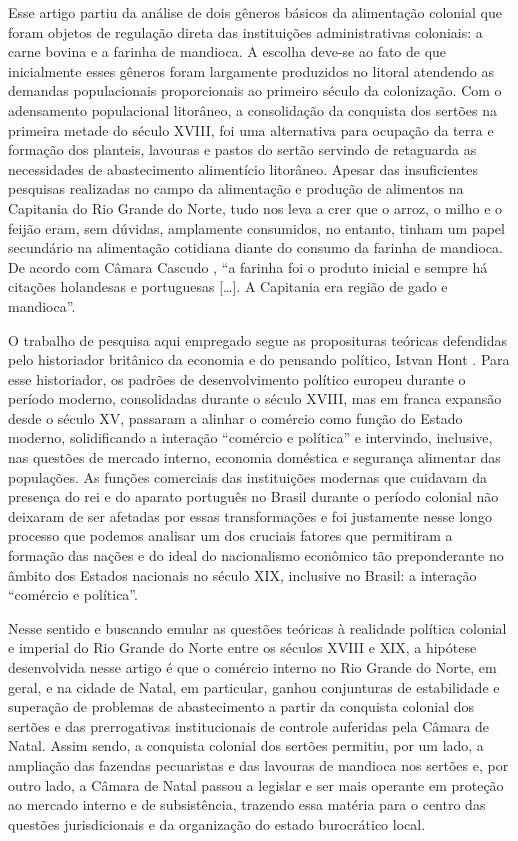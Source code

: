 \begin{refsection}
Esse artigo partiu da análise de dois gêneros básicos da alimentação colonial que foram objetos de regulação direta das instituições administrativas coloniais: a carne bovina e a farinha de mandioca. A escolha deve-se ao fato de que inicialmente esses gêneros foram largamente produzidos no litoral atendendo as demandas populacionais proporcionais ao primeiro século da colonização. Com o adensamento populacional litorâneo, a consolidação da conquista dos sertões na primeira metade do século XVIII, foi uma alternativa para ocupação da terra e formação dos planteis, lavouras e pastos do sertão servindo de retaguarda as necessidades de abastecimento alimentício litorâneo. Apesar das insuficientes pesquisas realizadas no campo da alimentação e produção de alimentos na Capitania do Rio Grande do Norte, tudo nos leva a crer que o arroz, o milho e o feijão eram, sem dúvidas, amplamente consumidos, no entanto, tinham um papel secundário na alimentação cotidiana diante do consumo da farinha de mandioca. De acordo com Câmara Cascudo \citeyear[p.~78]{Cascudo1980}, “a farinha foi o produto inicial e sempre há citações holandesas e portuguesas [\dots]. A Capitania era região de gado e mandioca”. 

O trabalho de pesquisa aqui empregado segue as proposituras teóricas defendidas pelo historiador britânico da economia e do pensando político, Istvan Hont \citeyear{hont2005jealousy}. Para esse historiador, os padrões de desenvolvimento político europeu durante o período moderno, consolidadas durante o século XVIII, mas em franca expansão desde o século XV, passaram a alinhar o comércio como função do Estado moderno, solidificando a interação ``comércio e política'' e intervindo, inclusive, nas questões de mercado interno, economia doméstica e segurança alimentar das populações. As funções comerciais das instituições modernas que cuidavam da presença do rei e do aparato português no Brasil durante o período colonial não deixaram de ser afetadas por essas transformações e foi justamente nesse longo processo que podemos analisar um dos cruciais fatores que permitiram a formação das nações e do ideal do nacionalismo econômico tão preponderante no âmbito dos Estados nacionais no século XIX, inclusive no Brasil: a interação ``comércio e política''. 

Nesse sentido e buscando emular as questões teóricas à realidade política colonial e imperial do Rio Grande do Norte entre os séculos XVIII e XIX, a hipótese desenvolvida nesse artigo é que o comércio interno no Rio Grande do Norte, em geral, e na cidade de Natal, em particular, ganhou conjunturas de estabilidade e superação de problemas de abastecimento a partir da conquista colonial dos sertões e das prerrogativas institucionais de controle auferidas pela Câmara de Natal. Assim sendo, a conquista colonial dos sertões permitiu, por um lado, a ampliação das fazendas pecuaristas e das lavouras de mandioca nos sertões e, por outro lado, a Câmara de Natal passou a legislar e ser mais operante em proteção ao mercado interno e de subsistência, trazendo essa matéria para o centro das questões jurisdicionais  e da organização do estado burocrático local. 


\end{refsection}
